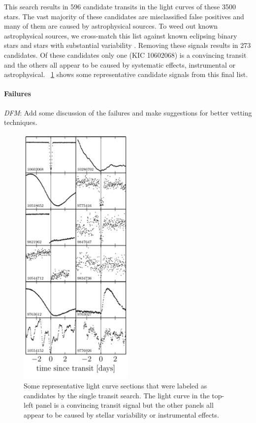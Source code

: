 \documentclass[12pt,preprint]{aastex}
\newcommand{\figref}[1]{\ref{fig:#1}}
\newcommand{\Fig}[1]{\figurename~\figref{#1}}
\newcommand{\figlabel}[1]{\label{fig:#1}}
\newcommand{\todo}[3]{{\color{#2}\emph{#1}: #3}}
\newcommand{\dfmtodo}[1]{\todo{DFM}{red}{#1}}
\begin{document}
This search results in 596 candidate transits in the light curves of these
3500 stars.
The vast majority of these candidates are misclassified false positives and
many of them are caused by astrophysical sources.
To weed out known astrophysical sources, we cross-match this list against
known eclipsing binary stars \citep{Matijevic:2012} and stars with substantial
variability \citep{McQuillan:2014}.
Removing these signals results in 273 candidates.
Of these candidates only one (KIC 10602068) is a convincing transit and the
others all appear to be caused by systematic effects, instrumental or
astrophysical.
\Fig{candidates} shows some representative candidate signals from this final
list.

\paragraph{Failures}

\dfmtodo{Add some discussion of the failures and make suggestions for better
vetting techniques.}


\begin{figure}[p]
\begin{center}
\includegraphics[width=0.5\textwidth]{figures/candidates.pdf}
\end{center}
\caption{%
Some representative light curve sections that were labeled as candidates by
the single transit search.
The light curve in the top-left panel is a convincing transit signal but the
other panels all appear to be caused by stellar variability or instrumental
effects.
\figlabel{candidates}}
\end{figure}
\end{document}
